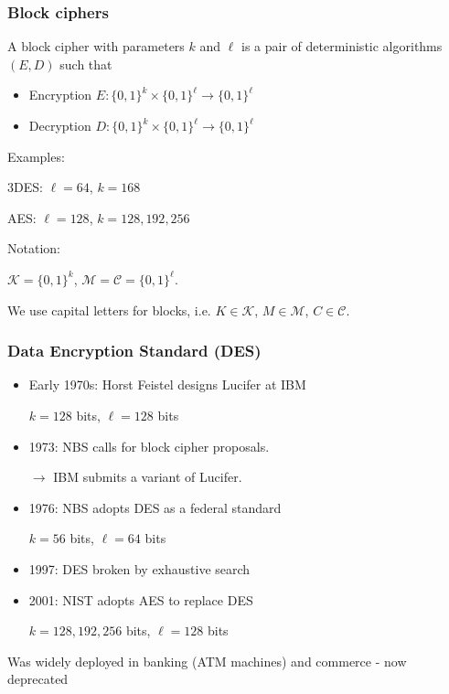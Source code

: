 \documentclass[aspectratio=169, lualatex, 10pt,dvipsnames,svgnames]{beamer} %
\def\envert#1{\textcolor{vert}{#1}}
\begin{document}
\begin{frame}
  
  \frametitle{Block ciphers}

  A block cipher with parameters $k$ and $\ell$ is a pair of deterministic algorithms $(E, D)$ such that
  \begin{itemize}
  \item Encryption $E: \{0, 1\}^k \times \{0, 1\}^\ell \rightarrow \{0, 1\}^\ell$
  \item Decryption $D: \{0, 1\}^k \times \{0, 1\}^\ell \rightarrow \{0, 1\}^\ell$
  \end{itemize}
  \bigskip{}

  \envert{Examples:}

  \hspace{1cm}\envert{3DES: $\ell=64$, $k=168$}

  \hspace{1cm}\envert{AES: $\ell=128$, $k=128, 192, 256$}
  \bigskip{}

  Notation: 
 
  \hspace{1cm}$\mathcal{K} = \{0, 1\}^k$, $\mathcal{M} = \mathcal{C} = \{0, 1\}^\ell$. 
    
    \hspace{1cm}We use capital letters for blocks, i.e. $K \in \mathcal{K}$, $M\in \mathcal{M}$, $C\in \mathcal{C}$.
\end{frame}

\begin{frame}

  \frametitle{Data Encryption Standard (DES)}

  \begin{itemize}

  \item Early 1970s: Horst Feistel designs Lucifer at IBM 
  
  $k = 128$ bits, $\ell = 128$ bits 
  \bigskip{}

  \item 1973: NBS calls for block cipher proposals. 

    $\longrightarrow$ IBM submits a variant of Lucifer.  
  \bigskip{}
 
  \item 1976: NBS adopts DES as a federal standard 

    $k = 56$ bits, $\ell = 64$ bits
    \bigskip{}
    
  \item 1997: DES broken by exhaustive search
    \bigskip{}
    
  \item 2001: NIST adopts AES to replace DES

    $k = 128, 192, 256$ bits, $\ell = 128$ bits
  \end{itemize}
  \bigskip{}

  Was widely deployed in banking (ATM machines) and commerce - now deprecated

\end{frame}
\end{document}
